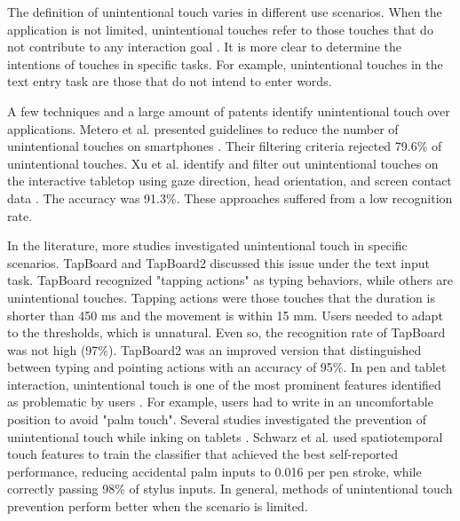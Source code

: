 The definition of unintentional touch varies in different use scenarios. When the application is not limited, unintentional touches refer to those touches that do not contribute to any interaction goal \cite{2020-TabletopTouch}. It is more clear to determine the intentions of touches in specific tasks. For example, unintentional touches in the text entry task are those that do not intend to enter words.

A few techniques \cite{2012-IdentifyUnint,2020-TabletopTouch} and a large amount of patents \cite{2016-Classification,2006-PadUnint,2013-System,2013-Precluding,2015-TouchScreen} identify unintentional touch over applications. Metero et al. presented guidelines to reduce the number of unintentional touches on smartphones \cite{2012-IdentifyUnint}. Their filtering criteria rejected 79.6\% of unintentional touches. Xu et al. identify and filter out unintentional touches on the interactive tabletop using gaze direction, head orientation, and screen contact data \cite{2020-TabletopTouch}. The accuracy was 91.3\%. These approaches suffered from a low recognition rate.

In the literature, more studies investigated unintentional touch in specific scenarios. TapBoard and TapBoard2 discussed this issue under the text input task. TapBoard recognized "tapping actions" as typing behaviors, while others are unintentional touches. Tapping actions were those touches that the duration is shorter than 450 ms and the movement is within 15 mm. Users needed to adapt to the thresholds, which is unnatural. Even so, the recognition rate of TapBoard was not high (97\%). TapBoard2 was an improved version that distinguished between typing and pointing actions with an accuracy of 95\%.
In pen and tablet interaction, unintentional touch is one of the most prominent features identified as problematic by users \cite{2014-PenMightier}. For example, users had to write in an uncomfortable position to avoid "palm touch". Several studies investigated the prevention of unintentional touch while inking on tablets \cite{2013-PalmInput,2014-PenUnint,2014-PalmRejection}. Schwarz et al. used spatiotemporal touch features to train the classifier \cite{2014-PalmRejection} that achieved the best self-reported performance, reducing accidental palm inputs to 0.016 per pen stroke, while correctly passing 98\% of stylus inputs.
In general, methods of unintentional touch prevention perform better when the scenario is limited.


